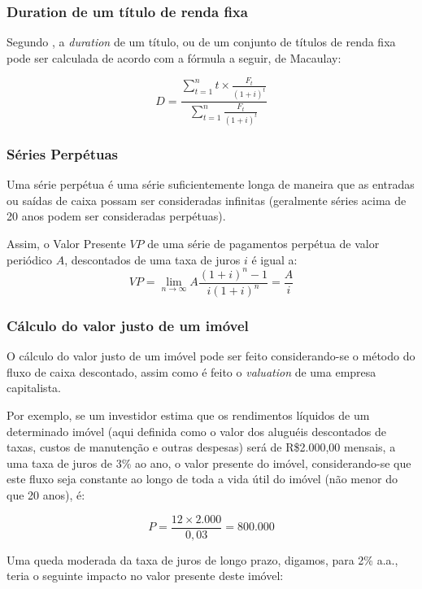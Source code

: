 \documentclass[
	12pt,				%
	oneside,			%
	a4paper,			%
	chapter=TITLE,		%
	section=TITLE,		%
	english,			%
	brazil				%
	]{abntex2}
\begin{document}
\subsubsection{Duration de um título de renda
fixa}\label{duration-de-um-tuxedtulo-de-renda-fixa}

Segundo \textcite{marins1}, a \emph{duration} de um título, ou de um
conjunto de títulos de renda fixa pode ser calculada de acordo com a
fórmula a seguir, de Macaulay:

\[D = \frac{\sum\limits_{t = 1}^{n} t \times \frac{F_t}{(1+i)^t}}{\sum\limits_{t = 1}^{n} \frac{F_t}{(1+i)^t}}\]

\subsubsection{Séries Perpétuas}\label{suxe9ries-perpuxe9tuas}

Uma série perpétua é uma série suficientemente longa de maneira que as
entradas ou saídas de caixa possam ser consideradas infinitas
(geralmente séries acima de 20 anos podem ser consideradas perpétuas).

Assim, o Valor Presente \(VP\) de uma série de pagamentos perpétua de
valor periódico \(A\), descontados de uma taxa de juros \(i\) é igual a:
\begin{equation}
VP = \lim_{n \to \infty} A \frac{(1+i)^n-1}{i(1+i)^n}= \frac{A}{i}
\label{eq:perpetua}
\end{equation}
\subsubsection{Cálculo do valor justo de um
imóvel}\label{cuxe1lculo-do-valor-justo-de-um-imuxf3vel}

O cálculo do valor justo de um imóvel pode ser feito considerando-se o
método do fluxo de caixa descontado, assim como é feito o
\emph{valuation} de uma empresa capitalista.

Por exemplo, se um investidor estima que os rendimentos líquidos de um
determinado imóvel (aqui definida como o valor dos aluguéis descontados
de taxas, custos de manutenção e outras despesas) será de R\$2.000,00
mensais, a uma taxa de juros de 3\% ao ano, o valor presente do imóvel,
considerando-se que este fluxo seja constante ao longo de toda a vida
útil do imóvel (não menor do que 20 anos), é:

\[P = \frac{12 \times 2.000}{0,03} = 800.000\]

Uma queda moderada da taxa de juros de longo prazo, digamos, para 2\%
a.a., teria o seguinte impacto no valor presente deste imóvel:
\end{document}
